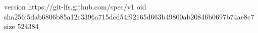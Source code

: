 version https://git-lfs.github.com/spec/v1
oid sha256:5dab6806b85a12c3396a715dcd54f92165d663b49800ab20846b0697b74ae8c7
size 524384
